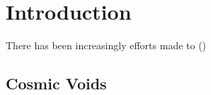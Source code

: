 \chapter{\label{intro}Introduction}
There has been increasingly efforts made to (\cite{birkinshaw_sunyaev-zeldovich_1999})
\section{Cosmic Voids}
\setcounter{equation}{0}
\setcounter{table}{0}
\setcounter{figure}{0}


    



